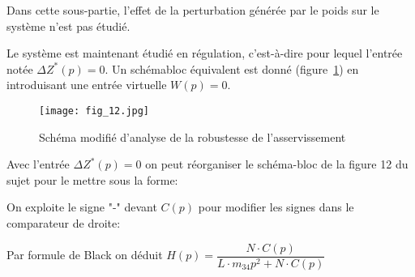 Dans cette sous-partie, l'effet de la perturbation générée par le poids sur le système n'est pas étudié.

Le système est maintenant étudié en régulation, c'est-à-dire pour lequel l'entrée notée $\Delta Z^{*}(p)=0$. Un schémabloc équivalent est donné (figure~\ref{fig:12}) en introduisant une entrée virtuelle $W(p)=0$.

\begin{figure}[H]
\centering
\texttt{[image: fig\_12.jpg]}
\caption{\label{fig:12} Schéma modifié d'analyse de la robustesse de l'asservissement}
\end{figure}
\fi


\ifprof
\begin{corrige}
Avec l'entrée $\Delta Z^*(p) = 0$ on peut réorganiser le schéma-bloc de la figure 12 du sujet pour le mettre sous la forme:

\begin{center}
\end{center}

On exploite le signe "-" devant $C(p)$ pour modifier les signes dans le comparateur de droite:

\begin{center}
\end{center}

Par formule de Black on déduit $\boxed{H(p) = \dfrac{N\cdot C(p)}{L\cdot m_{34}p^2 + N\cdot C(p)}}$

\end{corrige}
\else
\fi

